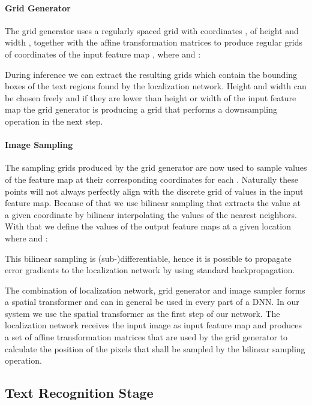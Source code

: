 \documentclass[10pt,twocolumn,letterpaper]{article}
\begin{document}
\paragraph{Grid Generator}
	The grid generator uses a regularly spaced grid  with coordinates , of height  and width , together with the affine transformation matrices  to produce  regular grids  of coordinates  of the input feature map , where  and :
	
	During inference we can extract the  resulting grids  which contain the bounding boxes of the text regions found by the localization network.
	Height  and width  can be chosen freely and if they are lower than height  or width  of the input feature map  the grid generator is producing a grid that performs a downsampling operation in the next step.
	
\paragraph{Image Sampling}
	The  sampling grids  produced by the grid generator are now used to sample values of the feature map  at their corresponding coordinates  for each . Naturally these points will not always perfectly align with the discrete grid of values in the input feature map.
	Because of that we use bilinear sampling that extracts the value at a given coordinate by bilinear interpolating the values of the nearest neighbors. With that we define the values of the  output feature maps  at a given location  where  and :
	
	This bilinear sampling is (sub-)differentiable, hence it is possible to propagate error gradients to the localization network by using standard backpropagation.

The combination of localization network, grid generator and image sampler forms a spatial transformer and can in general be used in every part of a \ac{DNN}.
In our system we use the spatial transformer as the first step of our network. The localization network receives the input image as input feature map and produces a set of affine transformation matrices that are used by the grid generator to calculate the position of the pixels that shall be sampled by the bilinear sampling operation.\\


\subsection{Text Recognition Stage}
\end{document}
